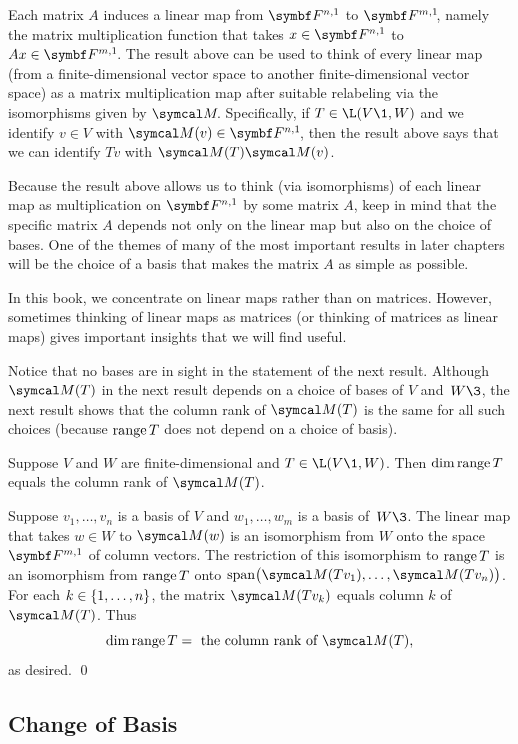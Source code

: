 Each  matrix $A$ induces a linear map from $\F{n,1}$ to $\FF{m,1}$, namely the matrix multiplication function that takes $x \in \F{n,1}$ to $Ax \in \FF{m,1}$. The result above can be used to think of every linear map (from a finite-dimensional vector space to another finite-dimensional vector space) as a matrix multiplication map after suitable relabeling via the isomorphisms given by $\M\!$. Specifically, if \mbox{$T \in \L(V\1,W)$} and we identify $v \in V$ with $\M(v) \in \FF{n,1}$, then the result above says that we can identify $Tv$ with $\M(T)\M(v)$.

Because the result above allows us to think (via isomorphisms) of each linear map as multiplication on $\F{n,1}$ by some matrix $A$, keep in mind that the specific matrix $A$ depends not only on the linear map but also on the choice of bases. One of the themes of many of the most important results in later chapters will be the choice of a basis that makes the matrix $A$ as simple as possible.

In this book, we concentrate on linear maps rather than on matrices. However, sometimes thinking of linear maps as matrices (or thinking of matrices as linear maps) gives important insights that we will find useful.

Notice that no bases are in sight in the statement of the next result. Although $\M(T)$ in the next result depends on a choice of bases of $V$ and~$W\3$, the next result shows that the column rank of $\M(T)$ is the same for all such choices (because $\operatorname{range} T$ does not depend on a choice of basis).

{Suppose $V$ and $W$ are finite-dimensional and $T \in \L(V\1, W)$. Then $\dim \operatorname{range} T$ equals the column rank of $\M(T)$.}

\proof
Suppose $v_1, \dots, v_n$ is a basis of $V$ and $w_1, \dots, w_m$ is a basis of~$W\3$.  The linear map that takes $w \in W$ to $\M(w)$ is an isomorphism from $W$ onto the space $\F{m,1}$ of  column vectors. The restriction of this isomorphism to $\operatorname{range} T$  is an isomorphism from $\operatorname{range} T$ onto $\Span\bigl( \M(Tv_1), \dots, \M(Tv_n) \bigr)$. For each $k \in \{1, \ldots, n\}$, the  matrix $\M(Tv_k)$ equals column $k$ of $\M(T)$. Thus
\[
\dim \ran T =  \text{ the column rank of } \M(T),
\]
as desired.
\qed

\subsection{Change of Basis}


